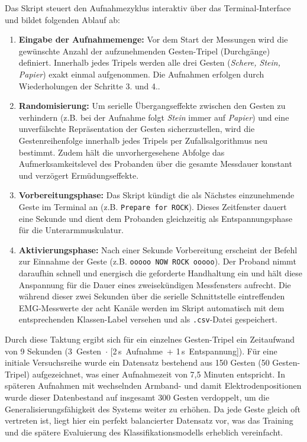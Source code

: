     Das Skript steuert den Aufnahmezyklus interaktiv über das Terminal-Interface und bildet folgenden Ablauf ab:
    \begin{enumerate}
        \item \textbf{Eingabe der Aufnahmemenge:} Vor dem Start der Messungen wird die gewünschte Anzahl der aufzunehmenden Gesten-Tripel (Durchgänge) definiert. Innerhalb jedes Tripels werden alle drei Gesten (\textit{Schere, Stein, Papier}) exakt einmal aufgenommen. Die Aufnahmen erfolgen durch Wiederholungen der Schritte 3. und 4.. 
        \item \textbf{Randomisierung:} Um serielle Übergangseffekte zwischen den Gesten zu verhindern (z.B. bei der Aufnahme folgt \textit{Stein} immer auf \textit{Papier}) und eine unverfälschte Repräsentation der Gesten sicherzustellen, wird die Gestenreihenfolge innerhalb jedes Tripels per Zufallsalgorithmus neu bestimmt. Zudem hält die unvorhergesehene Abfolge das Aufmerksamkeitslevel des Probanden über die gesamte Messdauer konstant und verzögert Ermüdungseffekte.
        \item \textbf{Vorbereitungsphase:} Das Skript kündigt die als Nächstes einzunehmende Geste im Terminal an (z.B. \texttt{Prepare for ROCK}). Dieses Zeitfenster dauert eine Sekunde und dient dem Probanden gleichzeitig als Entspannungsphase für die Unterarmmuskulatur.
        \item \textbf{Aktivierungsphase:} Nach einer Sekunde Vorbereitung erscheint der Befehl zur Einnahme der Geste (z.B. \texttt{ooooo NOW ROCK ooooo}). Der Proband nimmt daraufhin schnell und energisch die geforderte Handhaltung ein und hält diese Anspannung für die Dauer eines zweisekündigen Messfensters aufrecht. Die während dieser zwei Sekunden über die serielle Schnittstelle eintreffenden \ac{EMG}-Messwerte der acht Kanäle werden im Skript automatisch mit dem entsprechenden Klassen-Label versehen und als \texttt{.csv}-Datei gespeichert.
    \end{enumerate}
    Durch diese Taktung ergibt sich für ein einzelnes Gesten-Tripel ein Zeitaufwand von 9 Sekunden (3~Gesten~$\cdot$ [2\,s~Aufnahme~+ 1\,s~Entspannung]). Für eine initiale Versuchsreihe wurde ein Datensatz bestehend aus 150 Gesten (50 Gesten-Tripel) aufgezeichnet, was einer Aufnahmezeit von 7,5 Minuten entspricht. In späteren Aufnahmen mit wechselnden Armband- und damit Elektrodenpositionen wurde dieser Datenbestand auf insgesamt 300 Gesten verdoppelt, um die Generalisierungsfähigkeit des Systems weiter zu erhöhen. Da jede Geste gleich oft vertreten ist, liegt hier ein perfekt balancierter Datensatz vor, was das Training und die spätere Evaluierung des Klassifikationsmodells erheblich vereinfacht.


